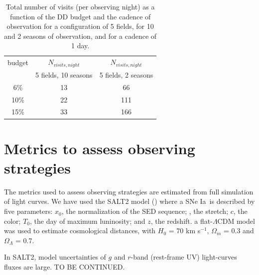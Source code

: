 \documentclass[\docopts]{\docclass}
\newcommand{\daymax}{$T_0$}
\newcommand{\sne}{{SNe Ia}}
\newcommand{\snx}{\mbox{$x_0$}}
\newcommand{\sncolor}{\mbox{$c$}}
\begin{document}
\begin{table}[!htbp]
  \caption{Total number of visits (per observing night) as a function of the DD budget and the cadence of observation for a configuration of 5 fields, for 10 and 2 seasons of observation, and for a cadence of 1 day.  }\label{tab:ddbudget}
  \begin{center}
    \begin{tabular}{c|c|c}
      \hline
      \hline
      budget & $N_{visits, night}$ & $N_{visits, night}$\\
                    & 5 fields, 10 seasons & 5 fields, 2 seasons \\
      \hline
      6\% & 13 & 66 \\
      10\% & 22 & 111 \\
      15\% & 33 & 166 \\
      \hline
    \end{tabular}
  \end{center}
\end{table}

\section{Metrics to assess observing strategies}
\label{sec:metrics}
The metrics used to assess observing strategies are estimated from full simulation of light curves. We have used the SALT2 model (\citealt{Guy_2007,Guy_2010}) where a \sne~is described by five parameters: \snx, the normalization of the SED sequence; \snstretch, the stretch; \sncolor, the color; \daymax, the day of maximum luninosity; and $z$, the redshift. a flat-$\Lambda$CDM model was used to estimate cosmological distances, with $H_0$ = 70 km s$^{-1}$, $\Omega_m$ = 0.3 and $\Omega_\Lambda$ = 0.7.
\par
In SALT2, model uncertainties of $g$ and $r$-band (rest-frame UV) light-curves fluxes are large.
TO BE CONTINUED.
\end{document}
